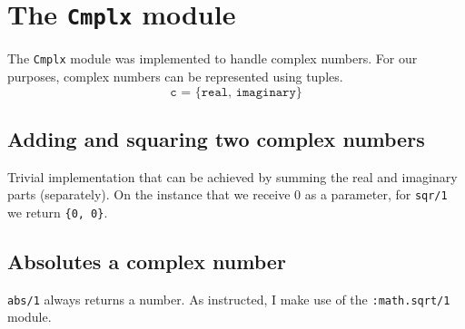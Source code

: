 \section{The \texttt{Cmplx} module}
The \texttt{Cmplx} module was implemented to handle complex numbers. For our purposes, complex numbers can be represented using tuples.
\begin{equation*}
     \texttt{c = \{real, imaginary\}}
\end{equation*}

\subsection{Adding and squaring two complex numbers}
Trivial implementation that can be achieved by summing the real and imaginary parts (separately). On the instance that we receive 0 as a parameter, for \texttt{sqr/1} we return \texttt{\{0, 0\}}.



\pagebreak
\subsection{Absolutes a complex number}
\texttt{abs/1} always returns a number. As instructed, I make use of the \texttt{:math.sqrt/1} module.
